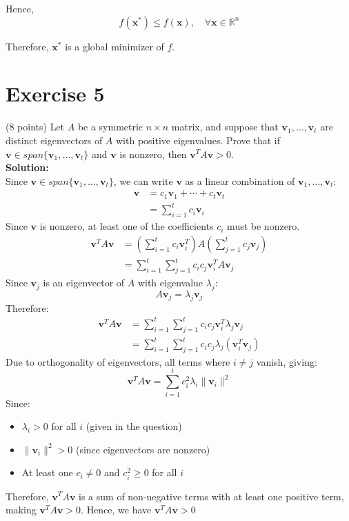 \documentclass{article}
\begin{document}
Hence,
$$
f(\mathbf{x}^*) \leq f(\mathbf{x}), \quad \forall \mathbf{x} \in \mathbb{R}^n
$$

Therefore, $\mathbf{x}^*$ is a global minimizer of $f$. \\

\newpage

\section*{Exercise 5}
(8 points) Let $A$ be a symmetric $n \times n$ matrix, and suppose that $\mathbf{v}_1,\ldots,\mathbf{v}_t$ are distinct eigenvectors of $A$ with positive eigenvalues. Prove that if $\mathbf{v} \in span\{\mathbf{v}_1,\ldots,\mathbf{v}_t\}$ and $\mathbf{v}$ is nonzero, then $\mathbf{v}^T A\mathbf{v} > 0$. \\

\textbf{Solution:} \\

Since $\mathbf{v} \in span\{\mathbf{v}_1,\ldots,\mathbf{v}_t\}$, we can write $\mathbf{v}$ as a linear combination of $\mathbf{v}_1,\ldots,\mathbf{v}_t$:
\begin{align*}
    \mathbf{v} &= c_1\mathbf{v}_1 + \cdots + c_t\mathbf{v}_t \\
    &= \sum_{i=1}^t c_i\mathbf{v}_i
\end{align*}
Since $\mathbf{v}$ is nonzero, at least one of the coefficients $c_i$ must be nonzero.
\begin{align*}
\mathbf{v}^T A\mathbf{v} &= \left(\sum_{i=1}^t c_i\mathbf{v}_i^T\right)A\left(\sum_{j=1}^t c_j\mathbf{v}_j\right) \\
&= \sum_{i=1}^t \sum_{j=1}^t c_ic_j\mathbf{v}_i^T A\mathbf{v}_j
\end{align*}
Since $\mathbf{v}_j$ is an eigenvector of $A$ with eigenvalue $\lambda_j$:
\[A\mathbf{v}_j = \lambda_j\mathbf{v}_j\]
Therefore:
\begin{align*}
\mathbf{v}^T A\mathbf{v} &= \sum_{i=1}^t \sum_{j=1}^t c_ic_j\mathbf{v}_i^T \lambda_j\mathbf{v}_j \\
&= \sum_{i=1}^t \sum_{j=1}^t c_ic_j\lambda_j(\mathbf{v}_i^T\mathbf{v}_j)
\end{align*}
Due to orthogonality of eigenvectors, all terms where $i \neq j$ vanish, giving:
    \[\mathbf{v}^T A\mathbf{v} = \sum_{i=1}^t c_i^2\lambda_i\|\mathbf{v}_i\|^2\]
Since:
\begin{itemize}
   \item $\lambda_i > 0$ for all $i$ (given in the question)
   \item $\|\mathbf{v}_i\|^2 > 0$ (since eigenvectors are nonzero)
   \item At least one $c_i \neq 0$ and $c_i^2 \geq 0$ for all $i$
\end{itemize}

Therefore, $\mathbf{v}^T A\mathbf{v}$ is a sum of non-negative terms with at least one positive term, making $\mathbf{v}^T A\mathbf{v} > 0$. Hence, we have $\mathbf{v}^T A\mathbf{v} > 0$
\end{document}

